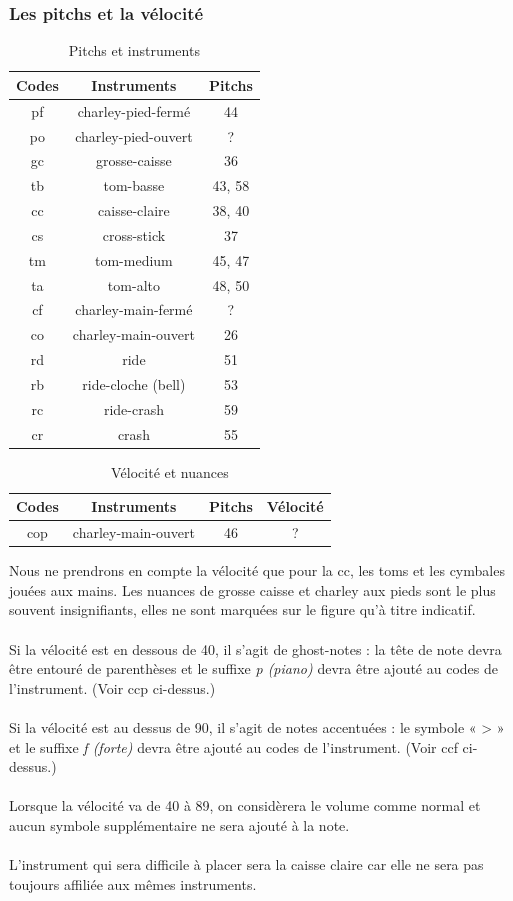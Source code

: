 \subsubsection{Les pitchs et la vélocité}
\begin{table}[h]
	\centering
	\begin{tabular}{|c|c|c|} \hline
		Codes & Instruments & Pitchs \\ \hline
		pf & charley-pied-fermé & 44 \\
		po & charley-pied-ouvert & ? \\
		gc & grosse-caisse & 36 \\
		tb & tom-basse & 43, 58 \\
		cc & caisse-claire & 38, 40 \\
		cs & cross-stick & 37 \\
		tm & tom-medium & 45, 47 \\
		ta & tom-alto & 48, 50 \\
		cf & charley-main-fermé & ? \\
		co & charley-main-ouvert & 26 \\
		rd & ride & 51 \\
		rb & ride-cloche (bell) & 53 \\
		rc & ride-crash & 59 \\
		cr & crash & 55 \\ \hline
	\end{tabular}
	\caption{Pitchs et instruments}
\end{table}
\begin{table}[h]
	\centering
	\begin{tabular}{|c|c|c|c|} \hline
		Codes & Instruments & Pitchs & Vélocité \\ \hline
		cop & charley-main-ouvert & 46 & ? \\ \hline
	\end{tabular}
	\caption{Vélocité et nuances}
\end{table}
Nous ne prendrons en compte la vélocité que pour la cc, les toms et les cymbales jouées aux mains. Les nuances de grosse caisse et charley aux pieds sont le plus souvent insignifiants, elles ne sont marquées sur le figure qu’à titre indicatif.\\\\
Si la vélocité est en dessous de 40, il s’agit de ghost-notes : la tête de note devra être entouré de parenthèses et le suffixe \textit{p (piano)} devra être ajouté au codes de l’instrument. (Voir ccp ci-dessus.)\\\\
Si la vélocité est au dessus de 90, il s’agit de notes accentuées : le symbole « > » et le suffixe \textit{f (forte)} devra être ajouté au codes de l’instrument. (Voir ccf ci-dessus.)\\\\
Lorsque la vélocité va de 40 à 89, on considèrera le volume comme normal et aucun symbole supplémentaire ne sera ajouté à la note.\\\\
L’instrument qui sera difficile à placer sera la caisse claire car elle ne sera pas toujours affiliée aux mêmes instruments.
